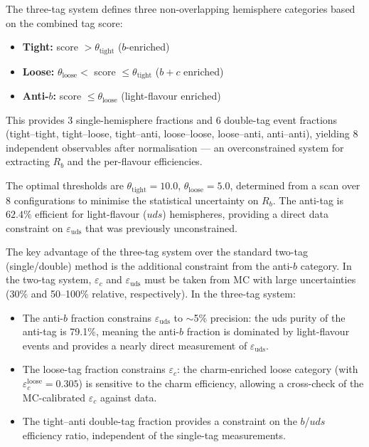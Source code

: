\documentclass[11pt,a4paper]{article}
\begin{document}
The three-tag system defines three non-overlapping hemisphere
categories based on the combined tag score:
\begin{itemize}
\item \textbf{Tight:} score $> \theta_\text{tight}$
  ($b$-enriched)
\item \textbf{Loose:} $\theta_\text{loose} <$ score $\leq
  \theta_\text{tight}$ ($b+c$ enriched)
\item \textbf{Anti-$b$:} score $\leq \theta_\text{loose}$
  (light-flavour enriched)
\end{itemize}
This provides 3 single-hemisphere fractions and 6 double-tag
event fractions (tight--tight, tight--loose, tight--anti,
loose--loose, loose--anti, anti--anti), yielding 8 independent
observables after normalisation --- an overconstrained system for
extracting $R_b$ and the per-flavour efficiencies.

The optimal thresholds are $\theta_\text{tight} = 10.0$,
$\theta_\text{loose} = 5.0$, determined from a scan over 8
configurations to minimise the statistical uncertainty on $R_b$.
The anti-tag is $62.4\%$ efficient for light-flavour ($uds$)
hemispheres, providing a direct data constraint on
$\varepsilon_\text{uds}$ that was previously unconstrained.

The key advantage of the three-tag system over the standard
two-tag (single/double) method is the additional constraint
from the anti-$b$ category.
In the two-tag system, $\varepsilon_c$ and $\varepsilon_\text{uds}$
must be taken from MC with large uncertainties (30\% and 50--100\%
relative, respectively).
In the three-tag system:
\begin{itemize}
\item The anti-$b$ fraction constrains $\varepsilon_\text{uds}$
  to $\sim$5\% precision: the uds purity of the anti-tag is 79.1\%,
  meaning the anti-$b$ fraction is dominated by light-flavour
  events and provides a nearly direct measurement of
  $\varepsilon_\text{uds}$.
\item The loose-tag fraction constrains $\varepsilon_c$: the
  charm-enriched loose category (with $\varepsilon_c^\text{loose}
  = 0.305$) is sensitive to the charm efficiency, allowing a
  cross-check of the MC-calibrated $\varepsilon_c$ against data.
\item The tight--anti double-tag fraction provides a constraint
  on the $b$/$uds$ efficiency ratio, independent of the
  single-tag measurements.
\end{itemize}
\end{document}
